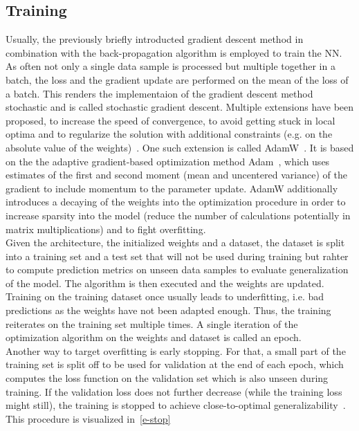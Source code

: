 \subsection{Training}
Usually, the previously briefly introducted gradient descent method in combination with the back-propagation algorithm is employed to train the NN.
As often not only a single data sample is processed but multiple together in a batch, the loss and the gradient update are performed on the mean of the loss of a batch.
This renders the implementaion of the gradient descent method stochastic and is called stochastic gradient descent.
Multiple extensions have been proposed, to increase the speed of convergence, to avoid getting stuck in local optima and to regularize the solution with additional constraints (e.g. on the absolute value of the weights)~\autocite{ruder_overview_2017}.
One such extension is called AdamW~\autocite{loshchilov_decoupled_2019}.
It is based on the the adaptive gradient-based optimization method Adam~\autocite{kingma_adam_2017}, which uses estimates of the first and second moment (mean and uncentered variance) of the gradient to include momentum to the parameter update.
AdamW additionally introduces a decaying of the weights into the optimization procedure in order to increase sparsity into the model (reduce the number of calculations potentially in matrix multiplications) and to fight overfitting. \\

Given the architecture, the initialized weights and a dataset, the dataset is split into a training set and a test set that will not be used during training but rahter to compute prediction metrics on unseen data samples to evaluate generalization of the model.
The algorithm is then executed and the weights  are updated.
Training on the training dataset once usually leads to underfitting, i.e. bad predictions as the weights have not been adapted enough.
Thus, the training reiterates on the training set multiple times.
A single iteration of the optimization algorithm on the weights and dataset is called an epoch. \\

Another way to target overfitting is early stopping.
For that, a small part of the training set is split off to be used for validation at the end of each epoch, which computes the loss function on the validation set which is also unseen during training.
If the validation loss does not further decrease (while the training loss might still), the training is stopped to achieve close-to-optimal generalizability~\autocite{raskutti_early_2013, gencay_pricing_2001}.
This procedure is visualized in~\ref{e-stop}

